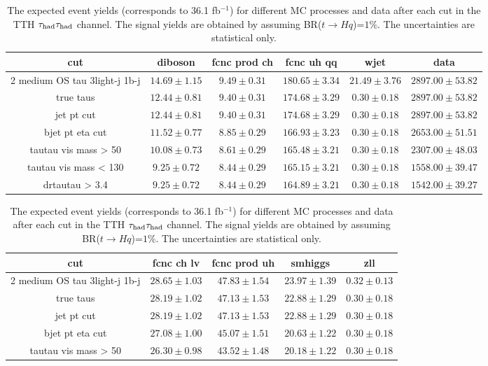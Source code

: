 \begin{table}
\footnotesize
\caption{ The expected event yields (corresponds to 36.1 fb$^{-1}$) for different MC processes and data after each cut in the TTH $\tau_\text{had}{}\tau_\text{had}$ channel. The signal yields are obtained by assuming BR($t\to Hq$)=$1\%$. The uncertainties are statistical only.}
\centering
\begin{tabular}{|c|c|c|c|c|c|} \hline

cut & diboson & fcnc prod ch & fcnc uh qq & wjet & data\\ \hline
2 medium OS tau 3light-j 1b-j & $14.69 \pm 1.15$ & $9.49 \pm 0.31$ & $180.65 \pm 3.34$ & $21.49 \pm 3.76$ & $2897.00 \pm 53.82$\\ \hline
true taus & $12.44 \pm 0.81$ & $9.40 \pm 0.31$ & $174.68 \pm 3.29$ & $0.30 \pm 0.18$ & $2897.00 \pm 53.82$\\ \hline
jet pt cut & $12.44 \pm 0.81$ & $9.40 \pm 0.31$ & $174.68 \pm 3.29$ & $0.30 \pm 0.18$ & $2897.00 \pm 53.82$\\ \hline
bjet pt eta cut & $11.52 \pm 0.77$ & $8.85 \pm 0.29$ & $166.93 \pm 3.23$ & $0.30 \pm 0.18$ & $2653.00 \pm 51.51$\\ \hline
tautau vis mass > 50 & $10.08 \pm 0.73$ & $8.61 \pm 0.29$ & $165.48 \pm 3.21$ & $0.30 \pm 0.18$ & $2307.00 \pm 48.03$\\ \hline
tautau vis mass < 130 & $9.25 \pm 0.72$ & $8.44 \pm 0.29$ & $165.15 \pm 3.21$ & $0.30 \pm 0.18$ & $1558.00 \pm 39.47$\\ \hline
drtautau > 3.4 & $9.25 \pm 0.72$ & $8.44 \pm 0.29$ & $164.89 \pm 3.21$ & $0.30 \pm 0.18$ & $1542.00 \pm 39.27$\\ \hline
\end{tabular}
\label{tab:yields_hh_1}
\begin{tabular}{|c|c|c|c|c|} \hline
cut & fcnc ch lv & fcnc prod uh & smhiggs & zll\\ \hline
2 medium OS tau 3light-j 1b-j & $28.65 \pm 1.03$ & $47.83 \pm 1.54$ & $23.97 \pm 1.39$ & $0.32 \pm 0.13$\\ \hline
true taus & $28.19 \pm 1.02$ & $47.13 \pm 1.53$ & $22.88 \pm 1.29$ & $0.30 \pm 0.18$\\ \hline
jet pt cut & $28.19 \pm 1.02$ & $47.13 \pm 1.53$ & $22.88 \pm 1.29$ & $0.30 \pm 0.18$\\ \hline
bjet pt eta cut & $27.08 \pm 1.00$ & $45.07 \pm 1.51$ & $20.63 \pm 1.22$ & $0.30 \pm 0.18$\\ \hline
tautau vis mass > 50 & $26.30 \pm 0.98$ & $43.52 \pm 1.48$ & $20.18 \pm 1.22$ & $0.30 \pm 0.18$\\ \hline

\end{tabular}
\end{table}
